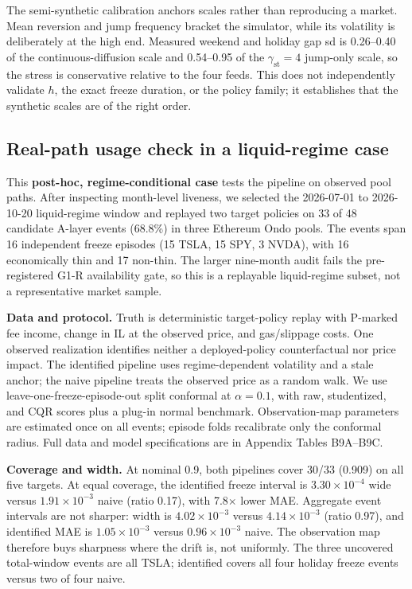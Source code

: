 The semi-synthetic calibration anchors scales rather than reproducing a market. Mean reversion and jump frequency bracket the simulator, while its volatility is deliberately at the high end. Measured weekend and holiday gap sd is 0.26--0.40 of the continuous-diffusion scale and 0.54--0.95 of the $\gamma_{\mathrm{st}}=4$ jump-only scale, so the stress is conservative relative to the four feeds. This does not independently validate $h$, the exact freeze duration, or the policy family; it establishes that the synthetic scales are of the right order.

\subsection{Real-path usage check in a liquid-regime case}

This \textbf{post-hoc, regime-conditional case} tests the pipeline on observed pool paths. After inspecting month-level liveness, we selected the 2026-07-01 to 2026-10-20 liquid-regime window and replayed two target policies on 33 of 48 candidate A-layer events (68.8\%) in three Ethereum Ondo pools. The events span 16 independent freeze episodes (15 TSLA, 15 SPY, 3 NVDA), with 16 economically thin and 17 non-thin. The larger nine-month audit fails the pre-registered G1-R availability gate, so this is a replayable liquid-regime subset, not a representative market sample.

\textbf{Data and protocol.} Truth is deterministic target-policy replay with P-marked fee income, change in IL at the observed price, and gas/slippage costs. One observed realization identifies neither a deployed-policy counterfactual nor price impact. The identified pipeline uses regime-dependent volatility and a stale anchor; the naive pipeline treats the observed price as a random walk. We use leave-one-freeze-episode-out split conformal at $\alpha=0.1$, with raw, studentized, and CQR scores plus a plug-in normal benchmark. Observation-map parameters are estimated once on all events; episode folds recalibrate only the conformal radius. Full data and model specifications are in Appendix Tables B9A--B9C.

\textbf{Coverage and width.} At nominal 0.9, both pipelines cover 30/33 (0.909) on all five targets. At equal coverage, the identified freeze interval is $3.30\times10^{-4}$ wide versus $1.91\times10^{-3}$ naive (ratio 0.17), with 7.8$\times$ lower MAE. Aggregate event intervals are not sharper: width is $4.02\times10^{-3}$ versus $4.14\times10^{-3}$ (ratio 0.97), and identified MAE is $1.05\times10^{-3}$ versus $0.96\times10^{-3}$ naive. The observation map therefore buys sharpness where the drift is, not uniformly. The three uncovered total-window events are all TSLA; identified covers all four holiday freeze events versus two of four naive.

